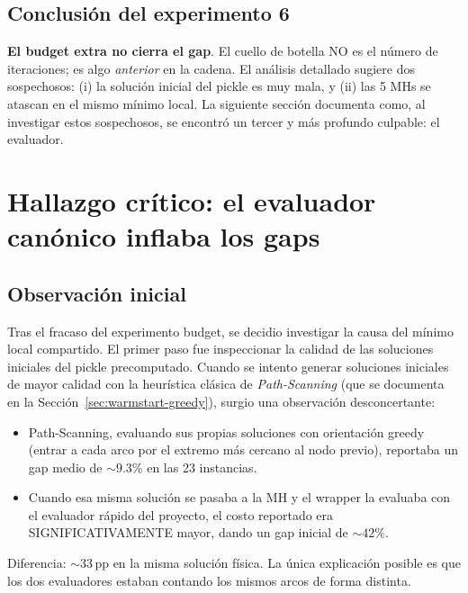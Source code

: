 \documentclass[11pt,a4paper]{article}
\theoremstyle{definition}
\theoremstyle{remark}
\begin{document}
\subsection{Conclusión del experimento 6}

\textbf{El budget extra no cierra el gap}. El cuello de botella NO es
el número de iteraciones; es algo \emph{anterior} en la cadena. El
análisis detallado sugiere dos sospechosos: (i) la solución inicial
del pickle es muy mala, y (ii) las 5 MHs se atascan en el mismo
mínimo local. La siguiente sección documenta como, al investigar
estos sospechosos, se encontró un tercer y más profundo culpable: el
evaluador.

\section{Hallazgo crítico: el evaluador canónico inflaba los gaps}
\label{sec:evaluador-canonico}

\subsection{Observación inicial}

Tras el fracaso del experimento budget, se decidio investigar la causa
del mínimo local compartido. El primer paso fue inspeccionar la
calidad de las soluciones iniciales del pickle precomputado. Cuando se
intento generar soluciones iniciales de mayor calidad con la heurística
clásica de \emph{Path-Scanning} (que se documenta en la
Sección~\ref{sec:warmstart-greedy}), surgio una observación
desconcertante:

\begin{itemize}
\item Path-Scanning, evaluando sus propias soluciones con orientación
  greedy (entrar a cada arco por el extremo más cercano al nodo
  previo), reportaba un gap medio de $\sim 9.3\%$ en las 23
  instancias.
\item Cuando esa misma solución se pasaba a la MH y el wrapper la
  evaluaba con el evaluador rápido del proyecto, el costo reportado
  era SIGNIFICATIVAMENTE mayor, dando un gap inicial de $\sim 42\%$.
\end{itemize}

Diferencia: $\sim 33$\,pp en la misma solución física. La única
explicación posible es que los dos evaluadores estaban contando los
mismos arcos de forma distinta.
\end{document}
